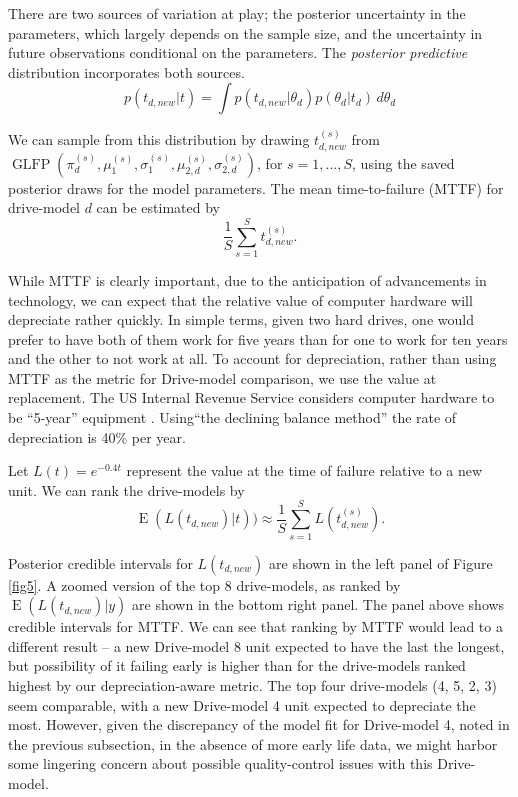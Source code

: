 \documentclass[12pt]{article}
\newcommand{\op}{\operatorname}
\begin{document}
There are two sources of variation at play; the
posterior uncertainty in the parameters, which largely depends on the
sample size, and the uncertainty in future
observations conditional on the parameters. The {\em posterior
  predictive} distribution incorporates both sources.
\begin{equation*}
  p(t_{d,new}|t) = \int p(t_{d,new}|\theta_d) p(\theta_d|t_d) \, d\theta_d
\end{equation*}

We can sample from this distribution by drawing $t_{d,new}^{(s)}$ from
$\operatorname{GLFP}(\pi_d^{(s)},
\mu_1^{(s)},\sigma_1^{(s)},\mu_{2,d}^{(s)},\sigma_{2,d}^{(s)})$, for
$s=1,...,S$, using the saved posterior draws for the model
parameters. The mean time-to-failure (MTTF) for drive-model $d$ can be estimated by
$$\frac{1}{S} \sum_{s=1}^{S} t_{d,new}^{(s)}.$$

While MTTF is clearly important, due to the
anticipation of advancements in technology, we can expect that the
relative value of computer hardware will depreciate rather quickly. In simple terms, given two hard drives, one would prefer to have both of them work for five years than for one to work for ten years and the other to not work at all. To account
for depreciation, rather than using MTTF as the metric for Drive-model comparison, we use the value at replacement. The US Internal Revenue Service considers
computer hardware to be ``5-year'' equipment \citep{f4562}. Using``the declining
balance method'' the rate of depreciation is 40\% per year.

Let $L(t) = e^{-0.4t}$ represent the value at the time of failure
relative to a new unit. We can rank the drive-models by 
$$\op{E}(L(t_{d,new})|t))\approx \frac{1}{S} \sum_{s=1}^{S} L(t_{d,new}^{(s)}).$$

Posterior credible intervals for $L(t_{d,new})$ are shown in the left panel of Figure \ref{fig5}. A zoomed version of the top 8 drive-models, as ranked by $\op{E}(L(t_{d,new})|y)$ are shown in the bottom right panel. The panel above shows credible intervals for MTTF. We can see that ranking by MTTF would lead to a different result -- a new Drive-model 8 unit expected to have the last the longest, but possibility of it failing early is higher than for the drive-models ranked highest by our depreciation-aware metric. The top four drive-models (4, 5, 2, 3) seem comparable, with a new Drive-model 4 unit expected to depreciate the most. However, given the discrepancy of the model fit for Drive-model 4, noted in the previous subsection, in the absence of more early life data, we might harbor some lingering concern about possible quality-control issues with this Drive-model.
\end{document}
